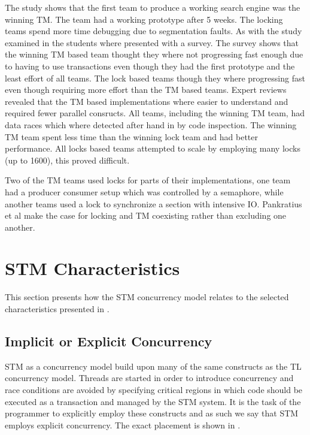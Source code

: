 The study shows that the first team to produce a working search engine was the winning \ac{TM}\cite[p. 6]{pankratius2009does}. The team had a working prototype after 5 weeks.   The locking teams spend more time debugging due to segmentation faults\cite[p. 6]{pankratius2009does}. As with the study examined in  the students where presented with a survey. The survey shows that the  winning \ac{TM} based team thought they where not progressing fast enough due to having to use transactions even though they had the first prototype and the least effort of all teams. The lock based teams though they where progressing fast even though requiring more effort than the \ac{TM} based teams\cite[p. 6]{pankratius2009does}. Expert reviews revealed that the \ac{TM} based implementations where easier to understand and required fewer parallel consructs\cite[p. 6]{pankratius2009does}. All teams, including the winning \ac{TM} team, had data races which where detected after hand in by code inspection\cite[p. 6]{pankratius2009does}. The winning \ac{TM} team spent less time than the winning lock team and had better performance\cite[p. 23]{pankratius2009does}. All locks based teams attempted to scale by employing many locks (up to 1600),  this proved difficult\cite[p. 23]{pankratius2009does}.

Two of the \ac{TM} teams used locks for parts of their implementations, one team had a producer consumer setup which was controlled by a semaphore, while another teams used a lock to synchronize a section with intensive \ac{IO}\cite[p. 5]{pankratius2009does}. Pankratius et al make the case for locking and \ac{TM} coexisting rather than excluding one another.

\section{\acs{STM} Characteristics}
\label{sec:stm_eval}
This section presents how the \ac{STM} concurrency model relates to the selected characteristics presented in . 

\subsection{Implicit or Explicit Concurrency}
\ac{STM} as a concurrency model build upon many of the same constructs as the \ac{TL} concurrency model. Threads are started in order to introduce concurrency and race conditions are avoided by specifying critical regions in which code should be executed as a transaction and managed by the \ac{STM} system. It is the task of the programmer to explicitly employ these constructs and as such we say that \ac{STM} employs explicit concurrency. The exact placement is shown in .

